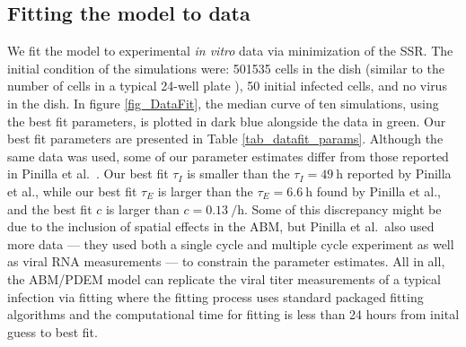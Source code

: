 

\subsection{Fitting the model to data}

We fit the model to experimental \emph{in vitro} data \cite{pinilla12} via minimization of the SSR. The initial condition of the simulations were: 501535 cells in the dish (similar to the number of cells in a typical 24-well plate \cite{Number_of_cells_in_a_dish_noauthor_useful_nodate}), 50 initial infected cells, and no virus in the dish. In figure \ref{fig_DataFit}, the median curve of ten simulations, using the best fit parameters, is plotted in dark blue alongside the data in green. Our best fit parameters are presented in Table \ref{tab_datafit_params}. Although the same data was used, some of our parameter estimates differ from those reported in Pinilla et al.\ \cite{pinilla12}. Our best fit $\tau_I$ is smaller than the $\tau_I = \SI{49}{\hour}$ reported by Pinilla et al., while our best fit $\tau_E$ is larger than the $\tau_E = \SI{6.6}{\hour}$ found by Pinilla et al., and the best fit $c$ is larger than $c = \SI{0.13}{\per\hour}$. Some of this discrepancy might be due to the inclusion of spatial effects in the ABM, but Pinilla et al.\ also used more data --- they used both a single cycle and multiple cycle experiment as well as viral RNA measurements --- to constrain the parameter estimates. All in all, the ABM/PDEM model can replicate the viral titer measurements of a typical infection via fitting where the fitting process uses standard packaged fitting algorithms and the computational time for fitting is less than 24 hours from inital guess to best fit.

